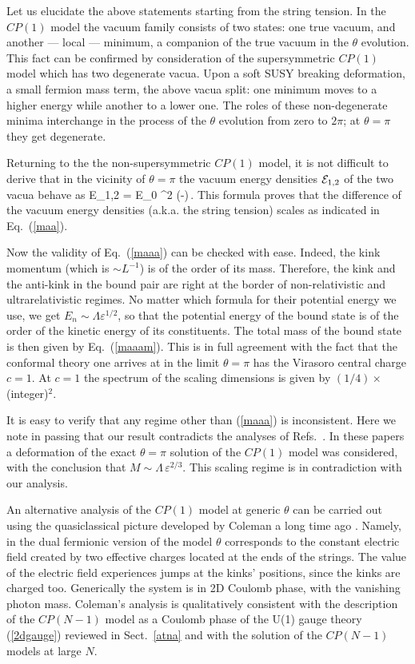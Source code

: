 Let us elucidate the above statements starting from the string tension.
In the $CP(1)$ model the vacuum family
consists of two states: one true vacuum, and another
--- local --- minimum,  a companion of the true vacuum
in the  $\theta$ evolution. This fact can be confirmed
by consideration of the supersymmetric
$CP(1)$ model which has two degenerate vacua.
Upon a soft SUSY breaking deformation, a small fermion mass
term, the above vacua split: one minimum moves to a higher energy
while another to a lower one. The roles of these 
non-degenerate minima interchange in the process of the $\theta$
evolution from zero to $2 \pi$;
at $\theta = \pi$ they get degenerate.

Returning to the the non-supersymmetric $CP(1)$ model,
it is not difficult to derive that in the vicinity of
$\theta = \pi$ the vacuum energy densities ${\cal E}_{1,2}$
of the two vacua behave as
\beq
{\cal E}_{1,2} = {\cal E}_{0} \pm \Lambda^2 \left(\theta -\pi\right)\,.
\label{maaamm}
\eeq
This formula proves that the difference of
the vacuum energy densities (a.k.a. the string tension)
scales as indicated in Eq.~(\ref{maa}).

Now the validity of Eq.~(\ref{maaa}) can be checked
with ease. Indeed, the kink momentum (which is $\sim L^{-1}$)
is of the order of its mass. Therefore, the kink and the anti-kink
in the bound pair are right at the border
of non-relativistic and ultrarelativistic regimes.
No matter which formula for their potential energy we use, we get
$E_n \sim \Lambda \varepsilon^{1/2}$, so that the potential energy 
of the bound state is of the order of the kinetic 
energy of its constituents. The total mass of the bound state is
then given by Eq.~(\ref{maaam}).
This is in full agreement with the fact \cite{Fat} that
the conformal theory one arrives at in the limit
$\theta =\pi$ has the Virasoro central charge $c=1$.
At $c=1$ the spectrum of the scaling dimensions
is given by $(1/4)\times$(integer)$^2$.

It is easy to verify that any regime other than (\ref{maaa})
is inconsistent. Here we note in passing that
our result contradicts the analyses of Refs.~\cite{Affl,Cont}.
In these papers a deformation of the exact $\theta =\pi$
solution of the $CP(1)$ model was considered, with the conclusion
that $M\sim \Lambda\,\varepsilon^{2/3}$. This scaling regime 
is in contradiction with our analysis.

An alternative analysis of the $CP(1)$ model
at generic $\theta$ can be carried out 
using the quasiclassical picture developed by Coleman a
long time ago \cite{Coleman}. Namely, in the dual fermionic version
of the model $\theta$ corresponds to the constant electric field
created by two effective charges located at the ends of the strings.
The value of the electric field experiences  jumps at the  kinks'
positions, since the kinks are charged too. Generically the system is in
2D Coulomb phase, with the vanishing photon mass.  Coleman's 
analysis  is qualitatively 
consistent with the description of the $CP(N-1)$ model as a Coulomb 
phase of the U(1) gauge theory (\ref{2dgauge}) reviewed in Sect.~\ref{atna}
and with the solution  \cite{5} of the $CP(N-1)$ models at large $N$.

